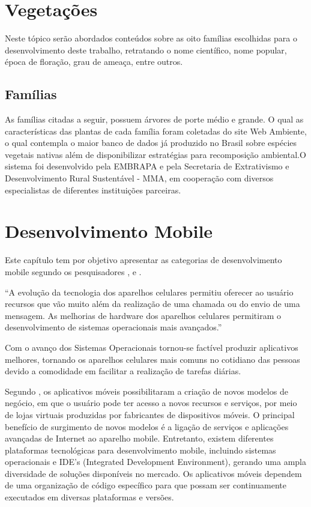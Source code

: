 \section{Vegetações}

Neste tópico serão abordados conteúdos sobre as oito famílias escolhidas para o desenvolvimento deste trabalho, retratando o nome científico, nome popular, época de floração, grau de ameaça, entre outros.

\subsection{Famílias}

As famílias citadas a seguir, possuem  árvores de porte médio e grande. O qual as características das plantas de cada família foram coletadas do site Web Ambiente, o qual contempla o maior banco de dados já produzido no Brasil sobre espécies vegetais nativas além de disponibilizar estratégias para recomposição ambiental.O sistema foi desenvolvido pela EMBRAPA e pela Secretaria de Extrativismo e Desenvolvimento Rural Sustentável - MMA, em cooperação com diversos especialistas de diferentes instituições parceiras.

\section{Desenvolvimento Mobile}

Este capítulo tem por objetivo apresentar as categorias de desenvolvimento mobile segundo os pesquisadores ,  e .

\begin{citacao}
	“A evolução da tecnologia dos aparelhos celulares permitiu oferecer ao usuário recursos que vão muito além da realização de uma chamada ou do envio de uma mensagem. As melhorias de hardware dos aparelhos celulares permitiram o desenvolvimento de sistemas operacionais mais avançados.”\cite[]{da2014paradigmas}
\end{citacao}

Com o avanço dos Sistemas Operacionais tornou-se factível produzir aplicativos melhores, tornando os aparelhos celulares mais comuns no cotidiano das pessoas devido a comodidade em facilitar a realização de tarefas diárias.

Segundo , os aplicativos móveis possibilitaram a criação de novos modelos de negócio, em que o usuário pode ter acesso a novos recursos e serviços, por meio de lojas virtuais produzidas por fabricantes de dispositivos móveis. O principal benefício de surgimento de novos modelos é a ligação de serviços e aplicações avançadas de Internet ao aparelho mobile. Entretanto, existem diferentes plataformas tecnológicas para desenvolvimento mobile, incluindo sistemas operacionais e IDE's  (Integrated Development Environment), gerando uma ampla diversidade de soluções disponíveis no mercado. Os aplicativos móveis dependem de uma organização de código específico para que possam ser continuamente executados em diversas plataformas e versões.

